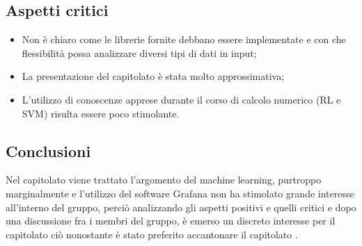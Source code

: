 \subsection{Aspetti critici}
\begin{itemize}
\item Non è chiaro come le librerie fornite debbano essere implementate e con che flessibilità possa analizzare diversi tipi di dati in input;
\item La presentazione del capitolato \`e stata molto approssimativa;
\item L'utilizzo di conoscenze apprese durante il corso di calcolo numerico (RL e SVM) risulta essere poco stimolante.

\end{itemize}
\subsection{Conclusioni}
Nel capitolato viene trattato l'argomento del machine learning,  purtroppo marginalmente e l'utilizzo del software Grafana non ha stimolato grande interesse all'interno del gruppo, perci\`o analizzando gli aspetti positivi e quelli critici e dopo una discussione fra i membri del gruppo, \`e emerso un discreto interesse per il capitolato ci\`o nonostante \`e stato preferito accantonare il capitolato .